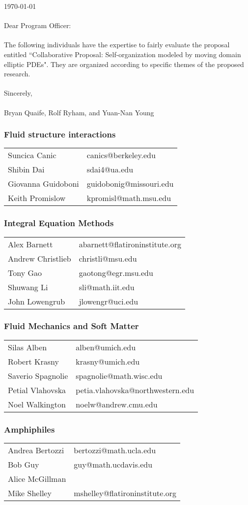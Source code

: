 \documentclass[11pt]{article}
\begin{document}
\sloppy

\noindent
\today \\ \\
Dear Program Officer:
\\ \\
\noindent
The following individuals have the expertise to fairly evaluate the 
proposal entitled ``Collaborative Proposal: Self-organization modeled by
moving domain elliptic PDEs". They are organized according to specific
themes of the proposed research.
\\ \\
Sincerely, \\ \\
Bryan Quaife, Rolf Ryham, and Yuan-Nan Young \\

\subsubsection*{Fluid structure interactions}
\begin{tabular}{ll}
  Suncica Canic & canics@berkeley.edu \\
  Shibin Dai & sdai4@ua.edu \\
  Giovanna Guidoboni \qquad & guidobonig@missouri.edu \\
  Keith Promislow & kpromisl@math.msu.edu
\end{tabular}


\subsubsection*{Integral Equation Methods}
\begin{tabular}{ll}
  Alex Barnett & abarnett@flatironinstitute.org \\
  Andrew Christlieb \qquad &christli@msu.edu \\
  Tony Gao & gaotong@egr.msu.edu \\
  Shuwang Li & sli@math.iit.edu \\
  John Lowengrub & jlowengr@uci.edu
\end{tabular}


\subsubsection*{Fluid Mechanics and Soft Matter}
\begin{tabular}{ll}
Silas Alben & alben@umich.edu \\
Robert Krasny & krasny@umich.edu \\
Saverio Spagnolie \qquad & spagnolie@math.wisc.edu \\
Petial Vlahovska & petia.vlahovska@northwestern.edu \\
Noel Walkington & noelw@andrew.cmu.edu 
\end{tabular}


\subsubsection*{Amphiphiles}
\begin{tabular}{ll}
Andrea Bertozzi & bertozzi@math.ucla.edu \\
Bob Guy & guy@math.ucdavis.edu \\
Alice McGillman \qquad &  \\
Mike Shelley & mshelley@flatironinstitute.org 
\end{tabular}
\end{document}
